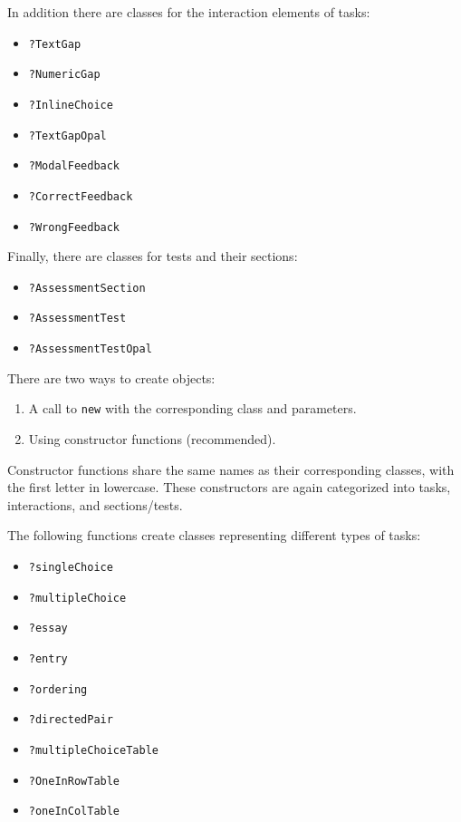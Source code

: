 \documentclass[twoside]{tufte-book}
\providecommand{\tightlist}{%
  \setlength{\itemsep}{0pt}\setlength{\parskip}{0pt}}
\begin{document}
In addition there are classes for the interaction elements of tasks:

\begin{itemize}
\tightlist
\item
  \texttt{?TextGap}
\item
  \texttt{?NumericGap}
\item
  \texttt{?InlineChoice}
\item
  \texttt{?TextGapOpal}
\item
  \texttt{?ModalFeedback}
\item
  \texttt{?CorrectFeedback}
\item
  \texttt{?WrongFeedback}
\end{itemize}

Finally, there are classes for tests and their sections:

\begin{itemize}
\tightlist
\item
  \texttt{?AssessmentSection}
\item
  \texttt{?AssessmentTest}
\item
  \texttt{?AssessmentTestOpal}
\end{itemize}


There are two ways to create objects:

\begin{enumerate}
\def\labelenumi{\arabic{enumi}.}
\tightlist
\item
  A call to \texttt{new} with the corresponding class and parameters.
\item
  Using constructor functions (recommended).
\end{enumerate}

Constructor functions share the same names as their corresponding classes, with the first letter in lowercase. These constructors are again categorized into tasks, interactions, and sections/tests.

The following functions create classes representing different types of tasks:

\begin{itemize}
\tightlist
\item
  \texttt{?singleChoice}
\item
  \texttt{?multipleChoice}
\item
  \texttt{?essay}
\item
  \texttt{?entry}
\item
  \texttt{?ordering}
\item
  \texttt{?directedPair}
\item
  \texttt{?multipleChoiceTable}
\item
  \texttt{?OneInRowTable}
\item
  \texttt{?oneInColTable}
\end{itemize}
\end{document}
